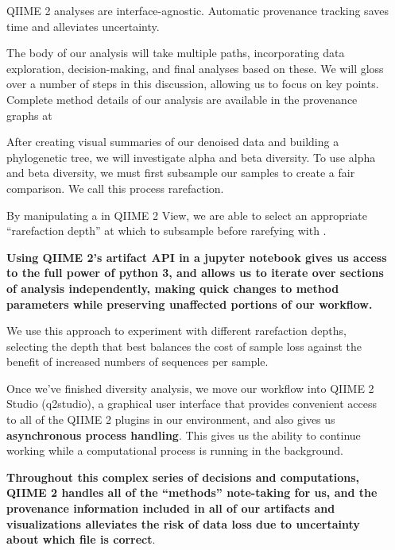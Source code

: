 \documentclass[final]{beamer}
\newlength{\sepwidth}
\newlength{\colwidth}
\newcommand{\separatorcolumn}{\begin{column}{\sepwidth}\end{column}}
\begin{document}
\begin{frame}[t]
\begin{columns}[t]
\separatorcolumn

\begin{column}{\colwidth}

  \begin{block}{QIIME 2 analyses are interface-agnostic. Automatic provenance tracking saves time and alleviates uncertainty.}

    The body of our analysis will take multiple paths, incorporating data
    exploration, decision-making, and final analyses based on these. We will
    gloss over a number of steps in this discussion, allowing us to focus on
    key points. Complete method details of our analysis are available in the
    provenance graphs at 

    After creating visual summaries of our denoised data and building a
    phylogenetic tree, we will investigate alpha and beta diversity. To use
    alpha and beta diversity, we must first subsample our samples to create a
    fair comparison. We call this process rarefaction.

    By manipulating a  in QIIME 2 View,
    we are able to select an appropriate “rarefaction depth” at which to
    subsample before rarefying with .

    \textbf{Using QIIME 2’s artifact API in a jupyter notebook gives us access to the
    full power of python 3, and allows us to iterate over sections of analysis
    independently, making quick changes to method parameters while preserving
    unaffected portions of our workflow.}

    We use this approach to experiment with different rarefaction depths,
    selecting the depth that best balances the cost of sample loss against the
    benefit of increased numbers of sequences per sample.


    Once we’ve finished diversity analysis, we move our workflow into QIIME 2
    Studio (q2studio), a graphical user interface that provides convenient
    access to all of the QIIME 2 plugins in our environment, and also gives us
    \textbf{asynchronous process handling}. This gives us the ability to continue
    working while a computational process is running in the background.

    \textbf{Throughout this complex series of decisions and computations, QIIME 2
    handles all of the “methods” note-taking for us, and the provenance
    information included in all of our artifacts and visualizations alleviates
    the risk of data loss due to uncertainty about which file is correct}.


\end{block}
\end{column}
\end{columns}
\end{frame}
\end{document}
